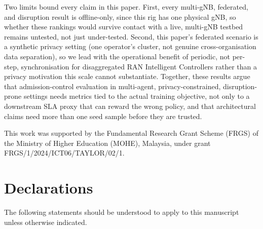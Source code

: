 \documentclass[pdflatex,sn-basic,Numbered]{sn-jnl}%
\begin{document}
Two limits bound every claim in this paper. First, every multi-gNB, federated, and disruption result is offline-only, since this rig has one physical gNB, so whether these rankings would survive contact with a live, multi-gNB testbed remains untested, not just under-tested.
Second, this paper's federated scenario is a synthetic privacy setting (one operator's cluster, not genuine cross-organisation data separation), so we lead with the operational benefit of periodic, not per-step, synchronisation for disaggregated RAN Intelligent Controllers rather than a privacy motivation this scale cannot substantiate. Together, these results argue that admission-control
evaluation in multi-agent, privacy-constrained, disruption-prone
settings needs metrics tied to the actual training objective, not only
to a downstream SLA proxy that can reward the wrong policy, and that
architectural claims need more than one seed sample before they are
trusted.

\backmatter

This work was supported by the Fundamental Research Grant Scheme
(FRGS) of the Ministry of Higher Education (MOHE), Malaysia, under
grant FRGS/1/2024/ICT06/TAYLOR/02/1.

\section*{Declarations}

\noindent The following statements should be understood to apply to
this manuscript unless otherwise indicated.
\end{document}
